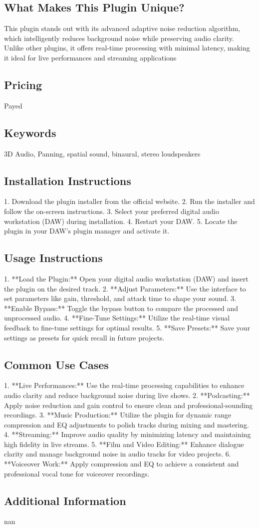 \documentclass[8pt]{article}
\begin{document}
    \subsection*{What Makes This Plugin Unique?}
    This plugin stands out with its advanced adaptive noise reduction algorithm, which intelligently reduces background noise while preserving audio clarity. Unlike other plugins, it offers real-time processing with minimal latency, making it ideal for live performances and streaming applications

    \subsection*{Pricing}
    Payed

    \subsection*{Keywords}
    3D Audio, Panning, spatial sound, binaural, stereo loudspeakers

    \subsection*{Installation Instructions}
    1. Download the plugin installer from the official website.
2. Run the installer and follow the on-screen instructions.
3. Select your preferred digital audio workstation (DAW) during installation.
4. Restart your DAW.
5. Locate the plugin in your DAW’s plugin manager and activate it.

    \subsection*{Usage Instructions}
    1. **Load the Plugin:** Open your digital audio workstation (DAW) and insert the plugin on the desired track.
2. **Adjust Parameters:** Use the interface to set parameters like gain, threshold, and attack time to shape your sound.
3. **Enable Bypass:** Toggle the bypass button to compare the processed and unprocessed audio.
4. **Fine-Tune Settings:** Utilize the real-time visual feedback to fine-tune settings for optimal results.
5. **Save Presets:** Save your settings as presets for quick recall in future projects.

    \subsection*{Common Use Cases}
    1. **Live Performances:** Use the real-time processing capabilities to enhance audio clarity and reduce background noise during live shows.
2. **Podcasting:** Apply noise reduction and gain control to ensure clean and professional-sounding recordings.
3. **Music Production:** Utilize the plugin for dynamic range compression and EQ adjustments to polish tracks during mixing and mastering.
4. **Streaming:** Improve audio quality by minimizing latency and maintaining high fidelity in live streams.
5. **Film and Video Editing:** Enhance dialogue clarity and manage background noise in audio tracks for video projects.
6. **Voiceover Work:** Apply compression and EQ to achieve a consistent and professional vocal tone for voiceover recordings.

    \subsection*{Additional Information}
    nan
    
\end{document}
